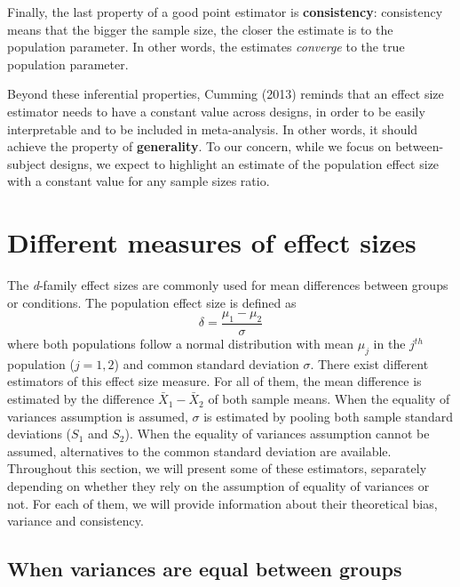 \documentclass[
  english,
  man,floatsintext]{apa6}
\begin{document}
Finally, the last property of a good point estimator is \textbf{consistency}: consistency means that the bigger the sample size, the closer the estimate is to the population parameter. In other words, the estimates \emph{converge} to the true population parameter.

Beyond these inferential properties, Cumming (2013) reminds that an effect size estimator needs to have a constant value across designs, in order to be easily interpretable and to be included in meta-analysis. In other words, it should achieve the property of \textbf{generality}. To our concern, while we focus on between-subject designs, we expect to highlight an estimate of the population effect size with a constant value for any sample sizes ratio.

\hypertarget{different-measures-of-effect-sizes}{%
\section{Different measures of effect sizes}\label{different-measures-of-effect-sizes}}

The \emph{d}-family effect sizes are commonly used for mean differences between groups or conditions. The population effect size is defined as
\begin{equation*} 
\delta = \frac{\mu_{1}-\mu_{2}}{\sigma} 
\label{eq:Cohendelta}
\end{equation*}
where both populations follow a normal distribution with mean \(\mu_j\) in the \(j^{th}\) population (\(j=1,2\)) and common standard deviation \(\sigma\). There exist different estimators of this effect size measure. For all of them, the mean difference is estimated by the difference \(\bar{X}_1-\bar{X}_2\) of both sample means. When the equality of variances assumption is assumed, \(\sigma\) is estimated by pooling both sample standard deviations (\(S_1\) and \(S_2\)). When the equality of variances assumption cannot be assumed, alternatives to the common standard deviation are available. Throughout this section, we will present some of these estimators, separately depending on whether they rely on the assumption of equality of variances or not. For each of them, we will provide information about their theoretical bias, variance and consistency.

\hypertarget{when-variances-are-equal-between-groups}{%
\subsection{When variances are equal between groups}\label{when-variances-are-equal-between-groups}}
\end{document}
